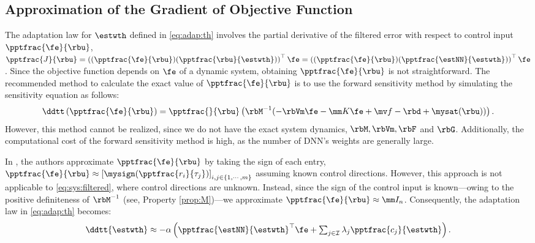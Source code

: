 \documentclass[lettersize,journal]{IEEEtran}
\begin{document}
\subsection{Approximation of the Gradient of Objective Function}

The adaptation law for $\estwth$ defined in \eqref{eq:adap:th} involves the partial derivative of the filtered error with respect to control input $\pptfrac{\fe}{\rbu}$, \ie 
$
    \pptfrac{J}{\rbu}
    =
    \left(
        (\pptfrac{\fe}{\rbu})
        (\pptfrac{\rbu}{\estwth})
    \right)
    ^\top \fe
    =
    \left(
        (\pptfrac{\fe}{\rbu})
        (\pptfrac{\estNN}{\estwth})
    \right)
    ^\top \fe
$. 
Since the objective function depends on $\fe$ of a dynamic system, obtaining $\pptfrac{\fe}{\rbu}$ is not straightforward. 
The recommended method to calculate the exact value of $\pptfrac{\fe}{\rbu}$ is to use the forward sensitivity method \cite{Sengupta:2014aa} by simulating the sensitivity equation as follows: 
\begin{equation}
    \ddtt 
    \left(
        \pptfrac{\fe}{\rbu}
    \right)
    =
    \pptfrac{}{
        \rbu
    }
    \left(
        \rbM^{-1}(
            -\rbVm \fe
            -\mm K \fe
            + \mv f
            -\rbd + \mysat(\rbu)
        )
    \right)
    .
\end{equation}
However, this method cannot be realized, since we do not have the exact system dynamics, \ie $\rbM,\rbVm, \rbF$ and $ \rbG$.
Additionally, the computational cost of the forward sensitivity method is high, as the number of DNN's weights are generally large.

In \cite{Douratsos:2007aa,Saerens:1991aa}, the authors approximate $\pptfrac{\fe}{\rbu}$ by taking the sign of each entry, \ie
$
    \pptfrac{\fe}{\rbu}
    \approx
    \left[
        \mysign(\pptfrac{r_i}{\tau_j})
    \right]_{i,j\in\{1,\cdots,m\}}
$ 
assuming known control directions.
However, this approach is not applicable to \eqref{eq:sys:filtered}, where control directions are unknown.
Instead, since the sign of the control input is known—owing to the positive definiteness of $\rbM^{-1}$ (see, Property \ref{prop:M})—we approximate $\pptfrac{\fe}{\rbu}\approx \mm I_n$.
Consequently, the adaptation law in \eqref{eq:adap:th} becomes:
\begin{equation}
    \ddtt{\estwth}
    \approx
    -\alpha 
    \left(
        \pptfrac{\estNN}
        {\estwth}^\top
        \fe
        +
        \textstyle\sum_{j\in\mathcal{I}}
        \lambda_j 
        \pptfrac{c_j}{\estwth}
    \right)
    .
    \label{eq:adap:th:approx}
\end{equation}
\end{document}
